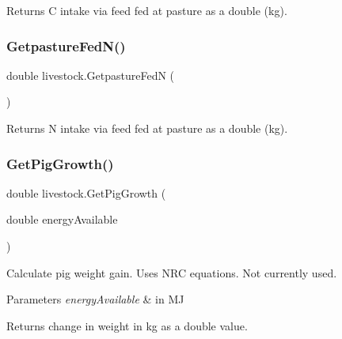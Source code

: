 Returns C intake via feed fed at pasture as a double (kg). 

\mbox{\label{classlivestock_a2fb8301f7beb23e3240f42e773376044}} 
\subsubsection{\texorpdfstring{GetpastureFedN()}{GetpastureFedN()}}
{\footnotesize\ttfamily double livestock.\+Getpasture\+FedN (\begin{DoxyParamCaption}{ }\end{DoxyParamCaption})\hspace{0.3cm}{\ttfamily [inline]}}



Returns N intake via feed fed at pasture as a double (kg). 

\mbox{\label{classlivestock_adffc58e33fd0d59a46ab0b49ce8c0c7b}} 
\subsubsection{\texorpdfstring{GetPigGrowth()}{GetPigGrowth()}}
{\footnotesize\ttfamily double livestock.\+Get\+Pig\+Growth (\begin{DoxyParamCaption}\item[{double}]{energy\+Available }\end{DoxyParamCaption})\hspace{0.3cm}{\ttfamily [inline]}}



Calculate pig weight gain. Uses N\+RC equations. Not currently used. 


\begin{DoxyParams}{Parameters}
{\em energy\+Available} & in MJ \\
\hline
\end{DoxyParams}
\begin{DoxyReturn}{Returns}
change in weight in kg as a double value. 
\end{DoxyReturn}
\mbox{\label{classlivestock_a3199154ed8a6b458c8d355c4697422bd}} 

